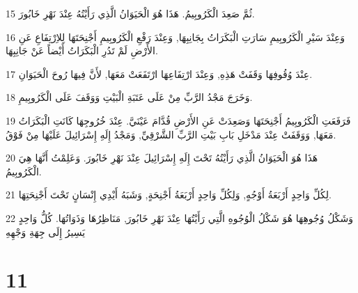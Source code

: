\par 15 ثُمَّ صَعِدَ الْكَرُوبِيمُ. هَذَا هُوَ الْحَيَوَانُ الَّذِي رَأَيْتُهُ عِنْدَ نَهْرِ خَابُورَ.
\par 16 وَعِنْدَ سَيْرِ الْكَرُوبِيمِ سَارَتِ الْبَكَرَاتُ بِجَانِبِهَا, وَعِنْدَ رَفْعِ الْكَرُوبِيمِ أَجْنِحَتَهَا لِلاِرْتِفَاعِ عَنِ الأَرْضِ لَمْ تَدُرِ الْبَكَرَاتُ أَيْضاً عَنْ جَانِبِهَا.
\par 17 عِنْدَ وُقُوفِهَا وَقَفَتْ هَذِهِ, وَعِنْدَ ارْتِفَاعِهَا ارْتَفَعَتْ مَعَهَا, لأَنَّ فِيهَا رُوحَ الْحَيَوَانِ.
\par 18 وَخَرَجَ مَجْدُ الرَّبِّ مِنْ عَلَى عَتَبَةِ الْبَيْتِ وَوَقَفَ عَلَى الْكَرُوبِيمِ.
\par 19 فَرَفَعَتِ الْكَرُوبِيمُ أَجْنِحَتَهَا وَصَعِدَتْ عَنِ الأَرْضِ قُدَّامَ عَيْنَيَّ. عِنْدَ خُرُوجِهَا كَانَتِ الْبَكَرَاتُ مَعَهَا, وَوَقَفَتْ عِنْدَ مَدْخَلِ بَابِ بَيْتِ الرَّبِّ الشَّرْقِيِّ, وَمَجْدُ إِلَهِ إِسْرَائِيلَ عَلَيْهَا مِنْ فَوْقُ.
\par 20 هَذَا هُوَ الْحَيَوَانُ الَّذِي رَأَيْتُهُ تَحْتَ إِلَهِ إِسْرَائِيلَ عِنْدَ نَهْرِ خَابُورَ. وَعَلِمْتُ أَنَّهَا هِيَ الْكَرُوبِيمُ.
\par 21 لِكُلِّ وَاحِدٍ أَرْبَعَةُ أَوْجُهٍ, وَلِكُلِّ وَاحِدٍ أَرْبَعَةُ أَجْنِحَةٍ, وَشَبَهُ أَيْدِي إِنْسَانٍ تَحْتَ أَجْنِحَتِهَا.
\par 22 وَشَكْلُ وُجُوهِهَا هُوَ شَكْلُ الْوُجُوهِ الَّتِي رَأَيْتُهَا عِنْدَ نَهْرِ خَابُورَ, مَنَاظِرُهَا وَذَوَاتُهَا. كُلُّ وَاحِدٍ يَسِيرُ إِلَى جِهَةِ وَجْهِهِ

\chapter{11}

